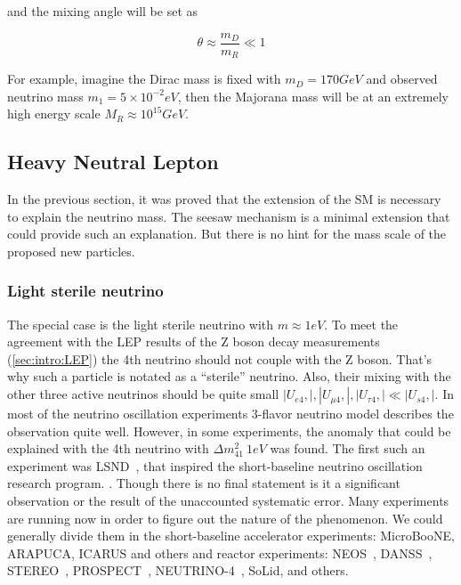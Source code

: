 \documentclass[../main.tex]{subfiles}
\begin{document}
and the mixing angle will be set as

\begin{equation}
\theta\approx\frac{m_D}{m_R} \ll 1
\end{equation}

For example, imagine the Dirac mass is fixed with $m_D=170 GeV$ and observed neutrino mass $m_1=5\times 10^{-2} eV$, then the Majorana mass will be at an extremely high energy scale $M_R\approx10^{15}GeV$.

\subsection{Heavy Neutral Lepton}
\label{sec:intro:HNL}
In the previous section, it was proved that the extension of the SM is necessary to explain the neutrino mass. The seesaw mechanism is a minimal extension that could provide such an explanation. But there is no hint for the mass scale of the proposed new particles.

\subsubsection{Light sterile neutrino}
The special case is the light sterile neutrino with $m\approx1eV$. To meet the agreement with the LEP results of the Z boson decay measurements (\autoref{sec:intro:LEP}) the 4th neutrino should not couple with the Z boson. That's why such a particle is notated as a ``sterile'' neutrino. Also, their mixing with the other three active neutrinos should be quite small $\left|U_{e4},\right|, \left|U_{\mu4},\right|, \left|U_{\tau4},\right| \ll \left|U_{s4},\right|$. In most of the neutrino oscillation experiments 3-flavor neutrino model describes the observation quite well. However, in some experiments, the anomaly that could be explained with the 4th neutrino with $\Delta m_{41}^2~1eV$ was found. The first such an experiment was LSND~\cite{Athanassopoulos1997}, that inspired the short-baseline neutrino oscillation research program. . Though there is no final statement is it a significant observation or the result of the unaccounted systematic error. Many experiments are running now in order to figure out the nature of the phenomenon. We could generally divide them in the short-baseline accelerator experiments: MicroBooNE, ARAPUCA, ICARUS and others and reactor experiments: NEOS~\cite{Ko2017}, DANSS~\cite{Alekseev2018}, STEREO~\cite{Almazan2018}, PROSPECT~\cite{Ashenfelter2018}, NEUTRINO-4~\cite{Serebrov2015}, SoLid, and others.
\end{document}
